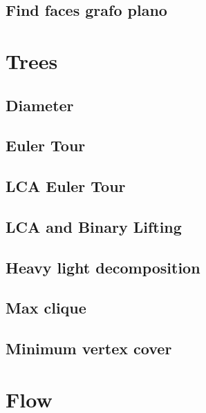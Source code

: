\subsection{Find faces grafo plano}
\raggedbottom
\hrulefill

\section{Trees}
\subsection{Diameter}
\raggedbottom
\hrulefill
\subsection{Euler Tour}
\raggedbottom
\hrulefill
\subsection{LCA Euler Tour}
\raggedbottom
\hrulefill
\subsection{LCA and Binary Lifting}
\raggedbottom
\hrulefill
\subsection{Heavy light decomposition}
\raggedbottom
\hrulefill
\subsection{Max clique}
\raggedbottom
\hrulefill
\subsection{Minimum vertex cover}
\raggedbottom
\hrulefill

\section{Flow}
